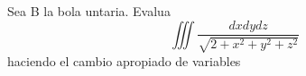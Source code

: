 Sea B la bola untaria. Evalua
$$
\iiint \frac{d x d y d z}{\sqrt{2+x^2+y^2+z^2}}
$$
haciendo el cambio apropiado de variables
